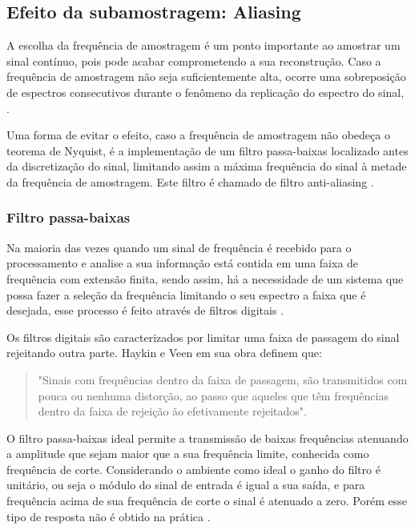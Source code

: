 \documentclass[journal]{IEEEtran}
\begin{document}
\subsection{Efeito da subamostragem: Aliasing}

A escolha da frequência de amostragem é um ponto importante ao amostrar um sinal contínuo, pois pode acabar comprometendo a sua reconstrução. Caso a frequência de amostragem não seja suficientemente alta, ocorre uma sobreposição de espectros consecutivos durante o fenômeno da replicação do espectro do sinal, \cite{Oppenheim} \cite{alan}. 

Uma forma de evitar o efeito, caso a frequência de amostragem não obedeça o teorema de Nyquist, é a implementação de um filtro passa-baixas localizado antes da discretização do sinal, limitando assim a máxima frequência do sinal à metade da frequência de amostragem. Este filtro é chamado de filtro anti-aliasing \cite{alan}.

\subsubsection{Filtro passa-baixas}
Na maioria das vezes quando um sinal de frequência é recebido para o processamento e analise a sua informação está contida em uma faixa de frequência com extensão finita, sendo assim, há a necessidade de um sistema que possa fazer a seleção da frequência limitando o seu espectro a faixa que é desejada, esse processo é feito através de filtros digitais \cite{haykin}.

Os filtros digitais são caracterizados por limitar uma faixa de passagem do sinal rejeitando outra parte. Haykin e Veen em sua obra definem \cite{haykin} que:

\begin{quote}
    "Sinais com frequências dentro da faixa de passagem, são transmitidos com pouca ou nenhuma distorção, ao passo que aqueles que têm frequências dentro da faixa de rejeição ão efetivamente rejeitados".
\end{quote}

O filtro passa-baixas ideal permite a transmissão de baixas frequências atenuando a amplitude que sejam maior que a sua frequência limite, conhecida como frequência de corte. Considerando o ambiente como ideal o ganho do filtro é unitário, ou seja o módulo do sinal de entrada é igual a sua saída, e para frequência acima de sua frequência de corte o sinal é atenuado a zero. Porém esse tipo de resposta não é obtido na prática \cite{Fernando}.
\end{document}
